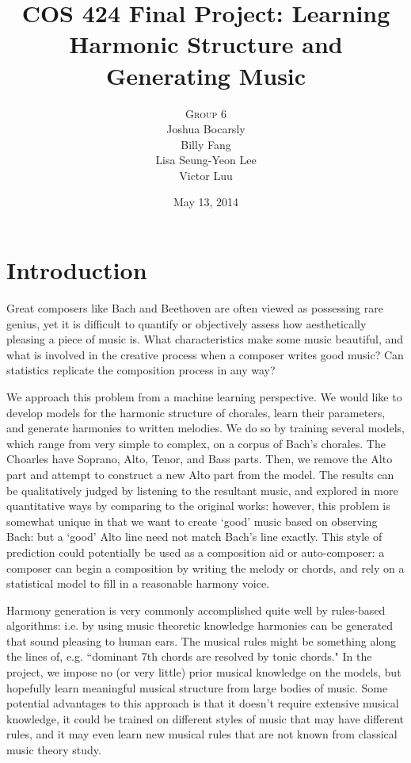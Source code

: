 \documentclass[11pt]{article}
\title{COS 424 Final Project: Learning Harmonic Structure and Generating Music}
\author{\textsc{Group 6} \\ Joshua Bocarsly \\ Billy Fang \\ Lisa Seung-Yeon Lee \\ Victor Luu}
\date{May 13, 2014}
\begin{document}
\maketitle
\newpage
{}
\section{Introduction}
Great composers like Bach and Beethoven are often viewed as possessing rare genius, yet it is difficult to quantify or objectively assess how aesthetically pleasing a piece of music is. What characteristics make some music beautiful, and what is involved in the creative process when a composer writes good music? Can statistics replicate the composition process in any way? \par
We approach this problem from a machine learning perspective. We would like to develop models for the harmonic structure of chorales, learn their parameters, and generate harmonies to written melodies. We do so by training several models, which range from very simple to complex, on a corpus of Bach's chorales. The Choarles have Soprano, Alto, Tenor, and Bass parts. Then, we remove the Alto part and attempt to construct a new Alto part from the model. The results can be qualitatively judged by listening to the resultant music, and explored in more quantitative ways by comparing to the original works: however, this problem is somewhat unique in that we want to create `good' music based on observing Bach: but a `good' Alto line need not match Bach's line exactly. This style of prediction could potentially be used as a composition aid or auto-composer: a composer can begin a composition by writing the melody or chords, and rely on a statistical model to fill in a reasonable harmony voice. \par
Harmony generation is very commonly accomplished quite well by rules-based algorithms: i.e. by using music theoretic knowledge harmonies can be generated that sound pleasing to human ears. The musical rules might be something along the lines of, e.g. ``dominant 7th chords are resolved by  tonic chords." In the project, we impose no (or very little) prior musical knowledge on the models, but hopefully learn meaningful musical structure from large bodies of music. Some potential advantages to this approach is that it doesn't require extensive musical knowledge, it could be trained on different styles of music that may have different rules, and it may even learn new musical rules that are not known from classical music theory study. \par
\end{document}
